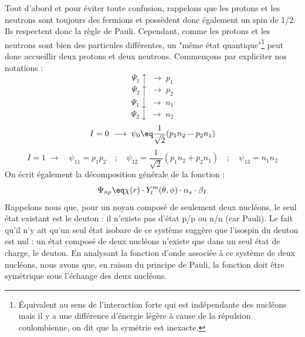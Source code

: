 Tout d'abord et pour éviter toute confusion, rappelons que les protons et les neutrons sont toujours des fermions et possèdent donc également un spin de 1/2. Ils respectent donc la règle de Pauli. Cependant, comme les protons et les neutrons sont bien des particules différentes, un "même état quantique"\footnote{Équivalent au sens de l'interaction forte qui est indépendante des nucléons mais il y a une différence d'énergie légère à cause de la répulsion coulombienne, on dit que la symétrie est inexacte.} peut donc accueillir deux protons et deux neutrons. Commençons par expliciter nos notations :
\begin{equation*}
    \Psi_1\uparrow \;\longrightarrow\; p_1
\end{equation*}
\begin{equation*}
    \Psi_2\uparrow \;\longrightarrow\; p_2
\end{equation*}
\begin{equation*}
    \Psi_1\downarrow\;\longrightarrow\; n_1
\end{equation*}
\begin{equation*}
    \Psi_2\downarrow\;\longrightarrow\; n_2
\end{equation*}
\begin{equation*}
    I = 0 \; \longrightarrow \; \psi_0 \eq \frac{1}{\sqrt{2}}(p_1n_2 - p_2n_1)
\end{equation*}
\begin{equation*}
    I = 1 \; \longrightarrow \quad \psi_{11} = p_1p_2 \quad;\quad \psi_{12} = \frac{1}{\sqrt{2}}(p_1n_2 + p_2n_1) \quad;\quad \psi_{13} = n_1n_2
\end{equation*}
On écrit également la décomposition générale de la fonction :
\begin{equation*}
    \Psi_{np} \eq \chi(r) \cdot Y_l^m(\theta,\phi) \cdot \alpha_s \cdot \beta_I
\end{equation*}
Rappelons nous que, pour un noyau composé de seulement deux nucléons, le seul état existant est le deuton : il n'existe pas d'état p/p ou n/n (car Pauli). Le fait qu'il n'y ait qu'un seul état isobare de ce système suggère que l'isospin du deuton est nul : un état composé de deux nucléons n'existe que dans un seul état de charge, le deuton. En analysant la fonction d'onde associée à ce système de deux nucléons, nous avons que, en raison du principe de Pauli, la fonction doit être symétrique sous l'échange des deux nucléons.\\

